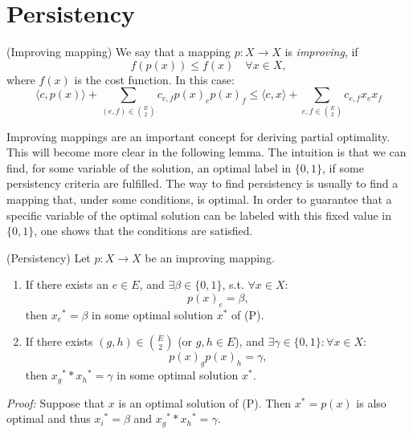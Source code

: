 \section{Persistency}
\begin{definition}{(Improving mapping)}
We say that a mapping $p: X \rightarrow X$ is \textit{improving}, if \[ f(p(x)) \leq f(x) \quad \forall x \in X, \] where $f(x)$ is the cost function. In this case: 
\begin{equation}
    \langle c,p(x) \rangle + \sum_{(e,f) \in {E \choose 2}} c_{e,f} p(x)_e p(x)_f \leq \langle c,x \rangle + \sum_{e,f \in {E \choose 2}} c_{e,f} x_e x_f 
\end{equation}
\end{definition}
Improving mappings are an important concept for deriving partial optimality. This will become more clear in the following lemma. The intuition is that we can find, for some variable of the solution, an optimal label in $\{0,1\}$, if some persistency criteria are fulfilled. The way to find persistency is usually to find a mapping that, under some conditions, is optimal. In order to guarantee that a specific variable of the optimal solution can be labeled with this fixed value in $\{0,1\}$, one shows that the conditions are satisfied.
\begin{lemma}{(Persistency)}
Let $p:X \to X$ be an improving mapping. 
\begin{enumerate} 
\item If there exists an $e \in E$, and $\exists \beta \in \{0,1 \}$, s.t. $\forall x \in X$:
\[ p(x)_e = \beta, \] then ${x_e}^* = \beta$ in some optimal solution $x^*$ of (P).
\item If there exists $(g,h) \in { E \choose 2 }$ (or $g, h \in E$), and $\exists \gamma \in \{0,1\}: \forall x \in X:$
\[ p(x)_g p(x)_h = \gamma, \] then ${x_g}^* * {x_h}^* = \gamma$ in some optimal solution $x^*$.
\end{enumerate}
\end{lemma}
\textit{Proof:} Suppose that $x$ is an optimal solution of (P). Then $x^*=p(x)$ is also optimal and thus ${x_i}^*=\beta$ and ${x_g}^* * {x_h}^*=\gamma$. 

